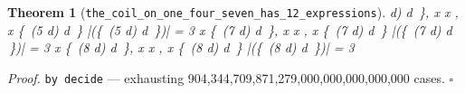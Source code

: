 \documentclass[11pt]{article}
\newtheorem{theorem}{Theorem}[section]
\begin{document}
\begin{theorem}[\texttt{the\_coil\_on\_one\_four\_seven\_has\_12\_expressions}]
d\right) \mid d \in [2,\,5,\,8] \,\},\; x \in [1,\,4,\,7] \land \forall x \in [1,\,4,\,7],\; x \in \{\, \mathopen{}\left(5 \cdot d\right) \mid d \in [2,\,5,\,8] \,\} \land \left|\left(\{\, \mathopen{}\left(5 \cdot d\right) \mid d \in [2,\,5,\,8] \,\}\right)\right| = 3 \land \forall x \in \{\, \mathopen{}\left(7 \cdot d\right) \mid d \in [1,\,4,\,7] \,\},\; x \in [1,\,4,\,7] \land \forall x \in [1,\,4,\,7],\; x \in \{\, \mathopen{}\left(7 \cdot d\right) \mid d \in [1,\,4,\,7] \,\} \land \left|\left(\{\, \mathopen{}\left(7 \cdot d\right) \mid d \in [1,\,4,\,7] \,\}\right)\right| = 3 \land \forall x \in \{\, \mathopen{}\left(8 \cdot d\right) \mid d \in [2,\,5,\,8] \,\},\; x \in [1,\,4,\,7] \land \forall x \in [1,\,4,\,7],\; x \in \{\, \mathopen{}\left(8 \cdot d\right) \mid d \in [2,\,5,\,8] \,\} \land \left|\left(\{\, \mathopen{}\left(8 \cdot d\right) \mid d \in [2,\,5,\,8] \,\}\right)\right| = 3 \]
\end{theorem}
\noindent\emph{Proof.} \texttt{by decide} --- exhausting 904,344,709,871,279,000,000,000,000,000 cases. \hfill$\square$
\end{document}
